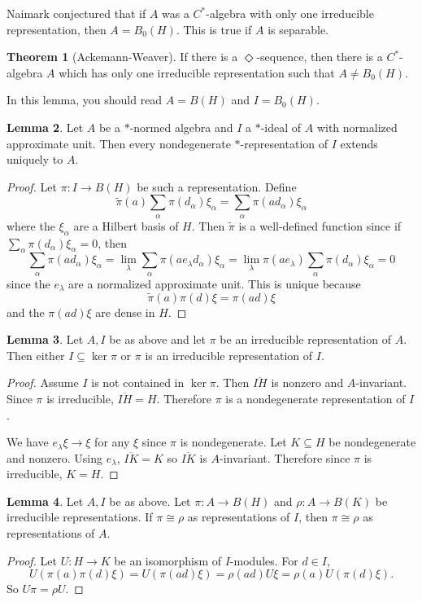 \documentclass[12pt]{report}
\theoremstyle{definition}
\newtheorem{theorem}{Theorem}[chapter]
\newtheorem{lemma}[theorem]{Lemma}
\begin{document}
Naimark conjectured that if $A$ was a $C^*$-algebra with only one irreducible representation, then $A = B_0(H)$. This is true if $A$ is separable.
\begin{theorem}[Ackemann-Weaver]
    If there is a $\Diamond$-sequence, then there is a $C^*$-algebra $A$ which has only one irreducible representation such that $A \neq B_0(H)$.
\end{theorem}

In this lemma, you should read $A = B(H)$ and $I = B_0(H)$.
\begin{lemma}
    Let $A$ be a $*$-normed algebra and $I$ a $*$-ideal of $A$ with normalized approximate unit. Then every nondegenerate $*$-representation of $I$ extends uniquely to $A$.
\end{lemma}
\begin{proof}
    Let $\pi: I \to B(H)$ be such a representation. Define
    $$\tilde \pi(a) \sum_\alpha \pi(d_\alpha) \xi_\alpha = \sum_\alpha \pi(ad_\alpha) \xi_\alpha$$
    where the $\xi_\alpha$ are a Hilbert basis of $H$. Then $\tilde \pi$ is a well-defined function since if $\sum_\alpha \pi(d_\alpha)\xi_\alpha = 0$, then
    $$\sum_\alpha \pi(ad_\alpha)\xi_\alpha = \lim_\lambda \sum_\alpha \pi(ae_\lambda d_\alpha) \xi_\alpha = \lim_\lambda \pi(ae_\lambda) \sum_\alpha \pi(d_\alpha)\xi_\alpha = 0$$
    since the $e_\lambda$ are a normalized approximate unit. This is unique because
    $$\tilde \pi(a)\pi(d)\xi = \pi(ad)\xi$$
    and the $\pi(ad)\xi$ are dense in $H$.
\end{proof}

\begin{lemma}
    Let $A,I$ be as above and let $\pi$ be an irreducible representation of $A$. Then either $I \subseteq \ker\pi$ or $\pi$ is an irreducible representation of $I$.
\end{lemma}
\begin{proof}
    Assume $I$ is not contained in $\ker \pi$. Then $\overline{IH}$ is nonzero and $A$-invariant. Since $\pi$ is irreducible, $\overline{IH} =H$. Therefore $\pi$ is a nondegenerate representation of $I$.

    We have $e_\lambda\xi \to \xi$ for any $\xi$ since $\pi$ is nondegenerate. Let $K \subseteq H$ be nondegenerate and nonzero. Using $e_\lambda$, $\overline{IK} = K$ so $\overline{IK}$ is $A$-invariant. Therefore since $\pi$ is irreducible, $K = H$.
\end{proof}

\begin{lemma}
    Let $A,I$ be as above. Let $\pi: A \to B(H)$ and $\rho: A \to B(K)$ be irreducible representations. If $\pi \cong \rho$ as representations of $I$, then $\pi \cong \rho$ as representations of $A$.
\end{lemma}
\begin{proof}
    Let $U: H \to K$ be an isomorphism of $I$-modules. For $d \in I$,
    $$U(\pi(a)\pi(d)\xi) = U(\pi(ad)\xi) = \rho(ad)U\xi = \rho(a)U(\pi(d)\xi).$$
    So $U\pi = \rho U$.
\end{proof}
\end{document}
